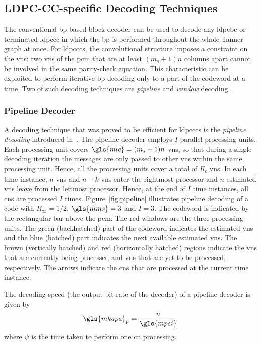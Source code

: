 \subsection{LDPC-CC-specific Decoding Techniques}
The conventional \gls{bp}-based block decoder can be used to decode any \gls{ldpcbc} or terminated \gls{ldpccc} in which the \gls{bp} is performed throughout the whole Tanner graph at once. For \glspl{ldpccc}, the convolutional structure imposes a constraint on the \glspl{vn}: two \glspl{vn} of the \gls{pcm} that are at least $(m_s+1)n$ columns apart cannot be involved in the same parity-check equation. This characteristic can be exploited to perform iterative \gls{bp} decoding only to a part of the codeword at a time. Two of such decoding techniques are \emph{pipeline} and \emph{window} decoding.
\subsubsection{Pipeline Decoder}
A decoding technique that was proved to be efficient for \glspl{ldpccc} is the \emph{pipeline decoding} introduced in~\cite{Felstrom1999}. The pipeline decoder employs $I$ parallel processing units. Each processing unit covers $\gls{mlc}=(m_s+1)n$ \glspl{vn}, so that during a single decoding iteration the messages are only passed to other \glspl{vn} within the same processing unit. Hence, all the processing units cover a total of $Il_c$ \glspl{vn}. In each time instance, $n$ \glspl{vn} and $n-k$ \glspl{vn} enter the rightmost processor and $n$ estimated \glspl{vn} leave from the leftmost processor. Hence, at the end of $I$ time instances, all \glspl{cn} are processed $I$ times. Figure~\ref{fig:pipeline} illustrates pipeline decoding of a code with $R_\infty=1/2$, $\gls{mms}=3$ and $I=3$. The codeword is indicated by the rectangular bar above the \gls{pcm}. The red windows are the three processing units. The green (backhatched) part of the codeword indicates the estimated \glspl{vn} and the blue (hatched) part indicates the next available estimated \glspl{vn}. The brown (vertically hatched) and red (horizontally hatched) regions indicate the \glspl{vn} that are currently being processed and \glspl{vn} that are yet to be processed, respectively. The arrows indicate the \glspl{cn} that are processed at the current time instance.

The decoding speed (the output bit rate of the decoder) of a pipeline decoder is given by
\begin{align}
\gls{mkapa}_{\text{p}}=\frac{n}{\gls{mpsi}}
\end{align}
where $\psi$ is the time taken to perform one \gls{cn} processing.

